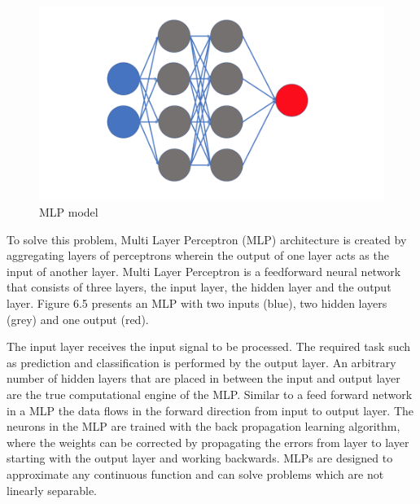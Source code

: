 \begin{figure}[h]
\centering
\includegraphics[width=1\textwidth]{./figures/mlp2.png}
\caption{MLP model}
\label{fig1}
\end{figure}

To solve this problem, Multi Layer Perceptron (MLP) architecture is created by aggregating layers of perceptrons wherein the output of one layer acts as the input of another layer. Multi Layer Perceptron \cite{C} is a feedforward neural network that consists of three layers, the input layer, the hidden layer and the output layer. Figure 6.5 presents an MLP with two inputs (blue), two hidden layers (grey) and one output (red). 

The input layer receives the input signal to be processed. The required task such as prediction and classification is performed by the output layer. An arbitrary number of hidden layers that are placed in between the input and output layer are the true computational engine of the MLP. Similar to a feed forward network in a MLP the data flows in the forward direction from input to output layer. The neurons in the MLP are trained with the back propagation learning algorithm, where the weights can be corrected by propagating the errors from layer to layer starting with the output layer and working backwards. MLPs are designed to approximate any continuous function and can solve problems which are not linearly separable.




